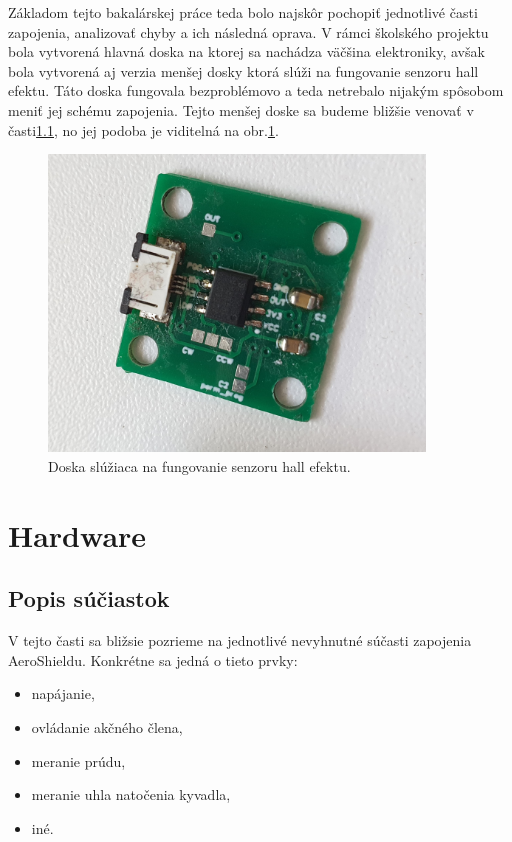 Základom tejto bakalárskej práce teda bolo najskôr pochopiť jednotlivé časti zapojenia, analizovať chyby a ich následná oprava. V rámci školského projektu bola vytvorená hlavná doska na ktorej sa nachádza väčšina elektroniky, avšak bola vytvorená aj verzia menšej dosky ktorá slúži na fungovanie senzoru hall efektu. Táto doska fungovala bezproblémovo a teda netrebalo nijakým spôsobom meniť jej schému zapojenia. Tejto menšej doske sa budeme bližšie venovať v časti\ref{}, no jej podoba je viditelná na obr.\ref{OBRAZOK 2.1.2}.

 \begin{figure}[!tbh]
\centering
\includegraphics[width=100mm]{obr/breakout.jpg}
\caption{Doska slúžiaca na fungovanie senzoru hall efektu.}\label{OBRAZOK 2.1.2}
\end{figure}

\vspace{3cm}


\section{Hardware}
\subsection{Popis súčiastok}

V tejto časti sa bližsie pozrieme na jednotlivé nevyhnutné súčasti zapojenia AeroShieldu. Konkrétne sa jedná o tieto prvky:
\begin{itemize}
\item napájanie,
\item ovládanie akčného člena,
\item meranie prúdu,
\item meranie uhla natočenia kyvadla,
\item iné.
\end{itemize}


